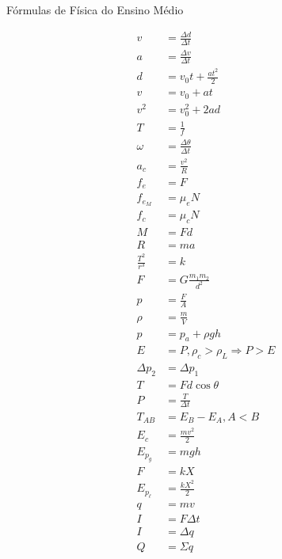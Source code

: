 \documentclass[12pt,a4paper]{article}
\date{}
\begin{document}
	\Large

	\begin{center}
		F\'ormulas de F\'isica do Ensino M\'edio
	\end{center}

	\normalsize

		\begin{flushright}
		\end{flushright}

		\begin{align}
			v &= \frac{\Delta d}{\Delta t} \\
			a &= \frac{\Delta v}{\Delta t} \\
			d &= v_0 t + \frac{at^2}{2} \\
			v &= v_0 + a t \\
			v^2 &= v_0^2 + 2 a d \\
			T &= \frac{1}{f} \\
			\omega &= \frac{\Delta \theta}{\Delta t} \\
			a_c &= \frac{v^2}{R} \\
			f_e &= F \\
			f_{e_M} &= \mu_e N \\
			f_c &= \mu_c N \\
			M &= F d \\
			R &= m a \\
			\frac{T^2}{r^3} &= k \\
			F &= G \frac{m_1 m_2}{d^2} \\
			p &= \frac{F}{A} \\
			\rho &= \frac{m}{V} \\
			p &= p_a + \rho g h \\
			E &= P, \rho_c > \rho_L \Rightarrow P > E \\
			\Delta p_2 &= \Delta p_1 \\
			T &= F d \cos \theta \\
			P &= \frac{T}{\Delta t} \\
			T_{AB} &= E_B - E_A, A < B \\
			E_c &= \frac{m v^2}{2} \\
			E_{p_g} &= m g h \\
			F &= k X \\
			E_{p_\ell} &= \frac{k X^2}{2} \\
			q &= m v \\
			I &= F \Delta t \\
			I &= \Delta q \\
			Q &= \Sigma q
		\end{align}
\end{document}
